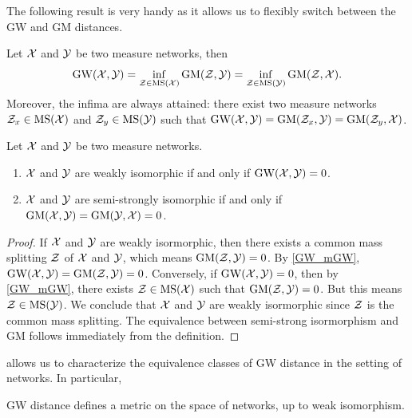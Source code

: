 The following result is very handy as it allows us to flexibly switch between the GW and GM distances.
\begin{corollary}
  \label{GW_mGW}
  Let $\mathcal X$ and $\mathcal Y$ be two measure networks, then
  \begin{equation*}
    \text{GW}(\mathcal X, \mathcal Y) = \inf_{\mathcal Z \in \text{MS}(\mathcal X)} \text{GM}(\mathcal Z, \mathcal Y)
    = \inf_{\mathcal Z \in \text{MS}(\mathcal Y)} \text{GM}(\mathcal Z, \mathcal X).
  \end{equation*}
  Moreover, the infima are always attained: there exist two measure networks $\mathcal Z_x \in \text{MS}(\mathcal X)$ and
  $\mathcal Z_y \in \text{MS}(\mathcal Y)$ such that
  $\text{GW}(\mathcal X, \mathcal Y) = \text{GM}(\mathcal Z_x, \mathcal Y) = \text{GM}(\mathcal Z_y, \mathcal X)$.
\end{corollary}
\begin{proposition} \label{prop:GW_iso}
  Let $\mathcal X$ and $\mathcal Y$ be two measure networks.
  \begin{enumerate}
    \item $\mathcal X$ and $\mathcal Y$ are weakly isomorphic if and only if $\text{GW}(\mathcal X, \mathcal Y) = 0$.
    \item $\mathcal X$ and $\mathcal Y$ are semi-strongly isomorphic if and only if
    $\text{GM}(\mathcal X, \mathcal Y) = \text{GM}(\mathcal Y, \mathcal X) = 0$.
  \end{enumerate}
\end{proposition}
\begin{proof}
  If $\mathcal X$ and $\mathcal Y$ are weakly isormorphic, then there exists a common mass splitting $\mathcal Z$ of $\mathcal X$ and $\mathcal Y$,
which means $\text{GM}(\mathcal Z, \mathcal Y) = 0$. By \cref{GW_mGW},
$\text{GW}(\mathcal X, \mathcal Y) = \text{GM}(\mathcal Z, \mathcal Y) = 0$. Conversely, if $\text{GW}(\mathcal X, \mathcal Y) = 0$,
then by \cref{GW_mGW}, there exists $\mathcal Z \in \text{MS}(\mathcal X)$ such that $\text{GM}(\mathcal Z, \mathcal Y) = 0$.
But this means $\mathcal Z \in \text{MS}(\mathcal Y)$. We conclude that $\mathcal X$ and $\mathcal Y$ are weakly isormorphic
since $\mathcal Z$ is the common mass splitting. The equivalence between semi-strong isormorphism and
GM follows immediately from the definition.
\end{proof}
 allows us to characterize the equivalence classes of GW distance in the
setting of networks. In particular,
\begin{proposition}
  GW distance defines a metric on the space of networks, up to weak isomorphism.
\end{proposition}
